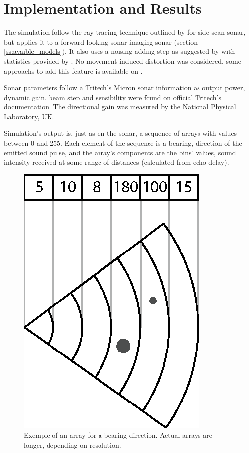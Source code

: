 
\section{Implementation and Results}

The simulation follow the ray tracing technique outlined by
\citet{bell1997simulation} for side scan sonar, but applies it to a forward
looking sonar imaging sonar (section \ref{ss:avaible_models}). It also uses a
noising adding step as suggested by \citet{coiras2009gpu} with statistics
provided by \citet{maussang2007mean}.
No movement induced distortion was considered, some approachs to add this
feature is available on \citet{bell1999techniques,borawski2005sonar}.

Sonar parameters follow a Tritech's Micron sonar\cite{micronsonar}
information as output power, dynamic gain, beam step and sensibility were found
on official Tritech's documentation\cite{micronsonar,micronmodem}. The directional
gain was measured by the National Physical Laboratory, UK.

Simulation's output is, just as on the sonar, a sequence of arrays with values
between 0 and 255. Each element of the sequence is a bearing, direction of the
emitted sound pulse, and the array's components are the bins' values, sound
intensity received at some range of distances (calculated from echo delay).

\begin{figure}[h]
	\centering
	\includegraphics[scale=1.,clip]{Chap2/fig/sonarresponse.eps}
	\caption{Exemple of an array for a bearing direction. Actual arrays are
	longer, depending on resolution.}
	\label{fig:bins}
\end{figure}

